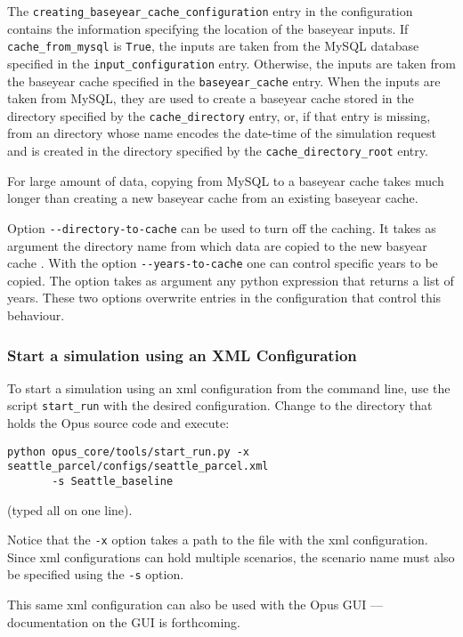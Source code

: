 The \verb|creating_baseyear_cache_configuration| entry in the configuration
contains the information specifying the location of the baseyear inputs.  
If \verb|cache_from_mysql| is \verb|True|, the inputs are taken from
the MySQL database specified in the \verb|input_configuration| entry. 
Otherwise, the inputs are taken from the baseyear cache specified in the
\verb|baseyear_cache| entry.  When the inputs are taken from MySQL, they are
used to create a baseyear cache stored in the directory specified by the
\verb|cache_directory| entry, or, if that entry is missing, from an directory
whose name encodes the date-time of the simulation request and is created in the
directory specified by the \verb|cache_directory_root| entry.  

For large amount of data, copying from MySQL to a baseyear cache takes much
longer than creating a new baseyear cache from an existing baseyear cache.  

Option \verb|--directory-to-cache| 
can be used to turn off the caching. It takes as argument the directory name
from which data are copied to the new basyear cache \baseyearcacheindex. With
the option \verb|--years-to-cache| one can control specific years to be
copied. The option takes as argument any python \pythonindex expression that returns a list
of years. These two options overwrite entries in the configuration that control
this behaviour.

\subsubsection{Start a simulation using an XML Configuration}
\label{sec:start-simulation-xml}

To start a simulation using an xml configuration from the command line, use
the script \verb|start_run| with the desired configuration.  Change to the
directory that holds the Opus source code and execute:
\begin{verbatim}
python opus_core/tools/start_run.py -x seattle_parcel/configs/seattle_parcel.xml 
       -s Seattle_baseline
\end{verbatim}
(typed all on one line).

Notice that the \verb|-x| option takes a path to the file with the xml
configuration.  Since xml configurations can hold multiple scenarios, the
scenario name must also be specified using the \verb|-s| option.

This same xml configuration can also be used with the Opus GUI ---
documentation on the GUI is forthcoming.


